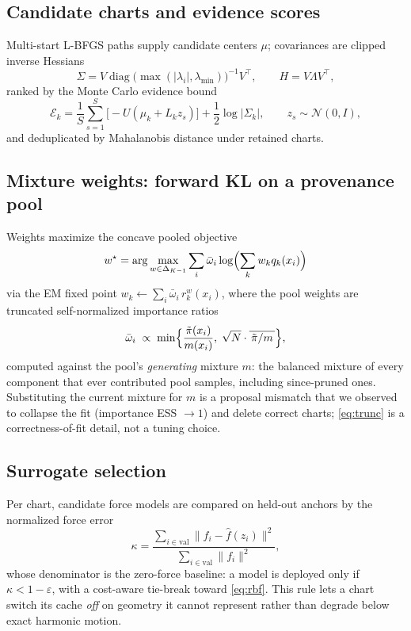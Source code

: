 \documentclass[11pt]{article}
\theoremstyle{remark}
\begin{document}
\subsection{Candidate charts and evidence scores}
Multi-start L-BFGS paths supply candidate centers $\mu$; covariances are
clipped inverse Hessians
\begin{equation}
\Sigma=V\operatorname{diag}\bigl(\max(\lvert\lambda_i\rvert,
\lambda_{\min})\bigr)^{-1}V^\top,\qquad H=V\Lambda V^\top,
\label{eq:clip}
\end{equation}
ranked by the Monte Carlo evidence bound
\begin{equation}
\mathcal E_k=\frac1S\sum_{s=1}^S\bigl[-U(\mu_k+L_kz_s)\bigr]
+\frac12\log\lvert\Sigma_k\rvert,\qquad z_s\sim\mathcal N(0,I),
\label{eq:elbo}
\end{equation}
and deduplicated by Mahalanobis distance under retained charts.

\subsection{Mixture weights: forward KL on a provenance pool}
Weights maximize the concave pooled objective
\begin{equation}
w^\star=\arg\max_{w\in\Delta_{K-1}}
\sum_i\bar\omega_i\log\Bigl(\sum_kw_kq_k(x_i)\Bigr)
\label{eq:fkl}
\end{equation}
via the EM fixed point $w_k\leftarrow\sum_i\bar\omega_i\,r_k^w(x_i)$,
where the pool weights are truncated self-normalized importance ratios
\citep{ionides2008}
\begin{equation}
\bar\omega_i\;\propto\;
\min\Bigl\{\frac{\tilde\pi(x_i)}{m(x_i)},\;
\sqrt N\cdot\overline{\,\tilde\pi/m\,}\Bigr\},
\label{eq:trunc}
\end{equation}
computed against the pool's \emph{generating} mixture $m$: the balanced
mixture of every component that ever contributed pool samples, including
since-pruned ones. Substituting the current mixture for $m$ is a
proposal mismatch that we observed to collapse the fit (importance ESS
$\to1$) and delete correct charts; \eqref{eq:trunc} is a
correctness-of-fit detail, not a tuning choice.

\subsection{Surrogate selection}
Per chart, candidate force models are compared on held-out anchors by the
normalized force error
\begin{equation}
\kappa=\frac{\sum_{i\in\mathrm{val}}
\lVert f_i-\hat f(z_i)\rVert^2}
{\sum_{i\in\mathrm{val}}\lVert f_i\rVert^2},
\label{eq:kappa}
\end{equation}
whose denominator is the zero-force baseline: a model is deployed only if
$\kappa<1-\varepsilon$, with a cost-aware tie-break toward \eqref{eq:rbf}.
This rule lets a chart switch its cache \emph{off} on geometry it cannot
represent rather than degrade below exact harmonic motion.
\end{document}
